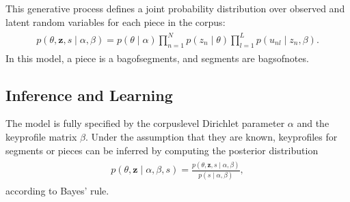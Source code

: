\documentclass[letterpaper,10pt,english]{sphinxmanual}
\begin{document}
\sphinxAtStartPar
This generative process defines a joint probability distribution over
observed and latent random variables for each piece in the corpus:
\begin{equation*}
\begin{split}\begin{aligned}
    p(\theta, \mathbf z, s \mid \alpha, \beta) = p(\theta \mid \alpha)\prod_{n=1}^N p(z_n \mid \theta) \prod_{l=1}^L p(u_{nl} \mid z_n, \beta).\end{aligned}\end{split}
\end{equation*}
\sphinxAtStartPar
In this model, a piece is a bag\sphinxhyphen{}of\sphinxhyphen{}segments, and segments are
bags\sphinxhyphen{}of\sphinxhyphen{}notes.


\subsection{Inference and Learning}
\label{\detokenize{5_notes:inference-and-learning}}
\sphinxAtStartPar
The model is fully specified by the corpus\sphinxhyphen{}level Dirichlet parameter
\(\alpha\) and the key\sphinxhyphen{}profile matrix \(\beta\). Under the
assumption that they are known, key\sphinxhyphen{}profiles for segments or pieces can
be inferred by computing the posterior distribution
\begin{equation*}
\begin{split}\begin{aligned}
    p(\theta, \mathbf z \mid \alpha, \beta, s) = \frac{p(\theta, \mathbf z, s \mid \alpha, \beta)}{p(s\mid \alpha, \beta)},\end{aligned}\end{split}
\end{equation*}
\sphinxAtStartPar
according to Bayes’ rule.
\end{document}
